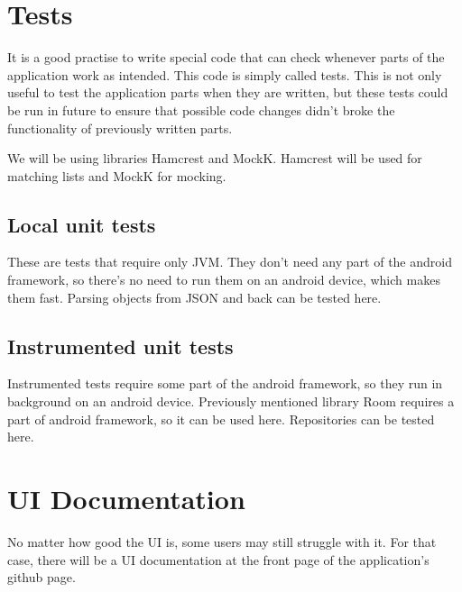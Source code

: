 \section{Tests}
It is a good practise to write special code that can check whenever parts of the application work as intended.
This code is simply called tests.
This is not only useful to test the application parts when they are written, but these tests could be run in future to ensure that possible code changes didn't broke the functionality of previously written parts.

We will be using libraries Hamcrest and MockK.
Hamcrest will be used for matching lists and MockK for mocking.

\subsection{Local unit tests}
These are tests that require only JVM.
They don't need any part of the android framework, so there's no need to run them on an android device, which makes them fast.
Parsing objects from JSON and back can be tested here.

\subsection{Instrumented unit tests}
Instrumented tests require some part of the android framework, so they run in background on an android device.
Previously mentioned library Room requires a part of android framework, so it can be used here.
Repositories can be tested here.

\section{UI Documentation}
No matter how good the UI is, some users may still struggle with it.
For that case, there will be a UI documentation at the front page of the application's github page.